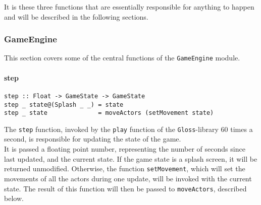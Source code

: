 \documentclass{article}
\begin{document}
		\noindent It is these three functions that are essentially responsible for anything to happen and will be described in the following sections.
        \subsubsection{GameEngine}
        This section covers some of the central functions of the \texttt{GameEngine} module.
        \paragraph{step}
        \begin{verbatim}
step :: Float -> GameState -> GameState
step _ state@(Splash _ _) = state
step _ state              = moveActors (setMovement state)
        \end{verbatim}

        \noindent The \texttt{step} function, invoked by the \texttt{play} function of the \texttt{Gloss}-library 60 times a second, is responsible for updating the state of the game. \\
        \newline
        It is passed a floating point number, representing the number of seconds since last updated, and the current state. If the game state is a splash screen, it will be returned unmodified. Otherwise, the function \texttt{setMovement}, which will set the movements of all the actors during one update, will be invoked with the current state. The result of this function will then be passed to \texttt{moveActors}, described below.
\newline
\end{document}
